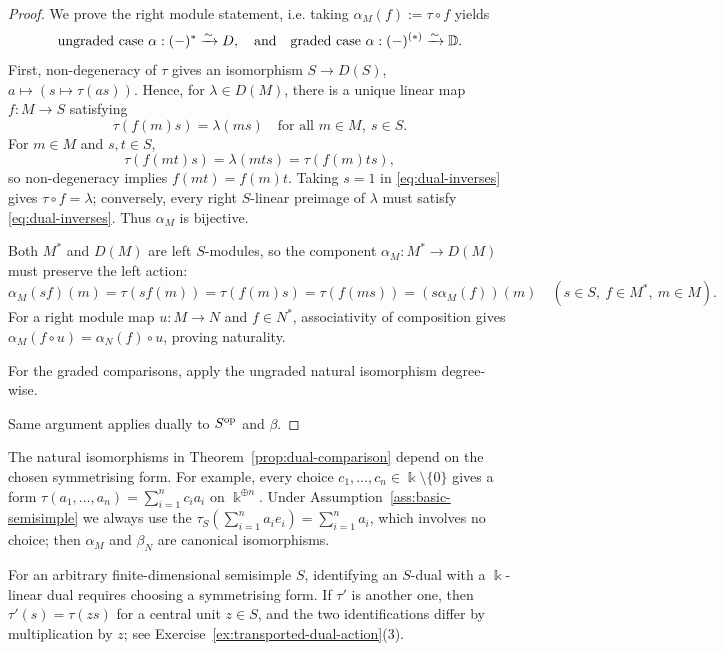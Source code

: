 \begin{advanced}[suppressfirstparskip=true,innertopmargin=0pt]
\begin{proof}
We prove the right module statement, i.e. taking $\alpha_M(f):= \tau\circ f$ yields 
\[
\text{ungraded case } \alpha: (-)^*\xrightarrow{\sim} D, \quad \text{and}\quad \text{graded case }\alpha: (-)^{(*)}\xrightarrow{\sim} \mathbb{D}.
\]
First, non-degeneracy of $\tau$ gives an isomorphism $S\to D(S)$, $a\mapsto(s\mapsto\tau(as))$.
Hence, for $\lambda\in D(M)$, there is a unique linear map $f:M\to S$ satisfying
\begin{equation}\label{eq:dual-inverses}
\tau(f(m)s)=\lambda(ms)\quad\text{for all }m\in M,\ s\in S.
\end{equation}
For $m\in M$ and $s,t\in S$,
\[
\tau(f(mt)s)=\lambda(mts)=\tau(f(m)ts),
\]
so non-degeneracy implies $f(mt)=f(m)t$.
Taking $s=1$ in \eqref{eq:dual-inverses} gives $\tau\circ f=\lambda$; conversely, every right $S$-linear preimage of $\lambda$ must satisfy \eqref{eq:dual-inverses}.
Thus $\alpha_M$ is bijective.

Both $M^*$ and $D(M)$ are left $S$-modules, so the component $\alpha_M:M^*\to D(M)$ must preserve the left action:
\[
\alpha_M(sf)(m)=\tau(sf(m))
=\tau(f(m)s)=\tau(f(ms))
=(s\alpha_M(f))(m)
\quad(s\in S,\ f\in M^*,\ m\in M).
\]
For a right module map $u:M\to N$ and $f\in N^*$, associativity of composition gives
$\alpha_M(f\circ u)=\alpha_N(f)\circ u$, proving naturality.

For the graded comparisons, apply the ungraded natural isomorphism degree-wise. 

Same argument applies dually to $S^{\mathrm{op}}$ and $\beta$.
\end{proof}

\begin{remark}\label{rem:standard-form}
The natural isomorphisms in Theorem~\ref{prop:dual-comparison} depend on the chosen symmetrising form.
For example, every choice $c_1,\ldots,c_n\in\Bbbk\setminus\{0\}$ gives a form
$\tau(a_1,\ldots,a_n)=\sum_{i=1}^n c_i a_i$ on $\Bbbk^{\oplus n}$.
Under Assumption~\ref{ass:basic-semisimple} we always use the  $\tau_S(\sum_{i=1}^na_ie_i)=\sum_{i=1}^na_i$, which involves no choice; then $\alpha_M$ and $\beta_N$ are canonical isomorphisms.
\end{remark}

\begin{remark}[General $S$]\label{rem:general-S-comparison}
For an arbitrary finite-dimensional semisimple $S$, identifying an $S$-dual with a $\Bbbk$-linear dual requires choosing a symmetrising form.
If $\tau'$ is another one, then $\tau'(s)=\tau(zs)$ for a central unit $z\in S$, and the two identifications differ by multiplication by $z$; see Exercise~\ref{ex:transported-dual-action}(3).
\end{remark}


\end{advanced}
